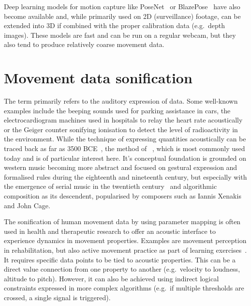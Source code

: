 Deep learning models for motion capture like PoseNet~\parencite{kendall2016posenet} or BlazePose~\parencite{bazarevsky2020blazepose} have also become available and, while primarily used on 2D (surveillance) footage, can be extended into 3D if combined with the proper calibration data (e.g.\ depth images).
These models are fast and can be run on a regular webcam, but they also tend to produce relatively coarse movement data.

\section{Movement data sonification}
\label{sec:movement-data-sonification}

The term  primarily refers to the auditory expression of data.
Some well-known examples include the beeping sounds used for parking assistance in cars, the electrocardiogram machines used in hospitals to relay the heart rate acoustically or the Geiger counter sonifying ionisation to detect the level of radioactivity in the environment.
While the technique of expressing quantities acoustically can be traced back as far as 3500 BCE~\parencite[178]{sonificationPreHistory}, the method of ~\parencite[Chapter~15]{sonificationHandbook}, which is most commonly used today and is of particular interest here.
It's conceptual foundation is grounded on western music becoming more abstract and focused on gestural expression and formalised rules during the eighteenth and nineteenth century, but especially with the emergence of serial music in the twentieth century~\parencite[179-180]{sonificationPreHistory} and algorithmic composition as its descendent, popularised by composers such as Iannis Xenakis and John Cage.

The sonification of human movement data by using parameter mapping is often used in health and therapeutic research to offer an acoustic interface to experience dynamics in movement properties.
Examples are movement perception in rehabilitation, but also active movement practice as part of learning exercises~\parencite[see][]{ifMotionSounds}.
It requires specific data points to be tied to acoustic properties.
This can be a direct value connection from one property to another (e.g.\ velocity to loudness, altitude to pitch).
However, it can also be achieved using indirect logical constraints expressed in more complex algorithms (e.g.\ if multiple thresholds are crossed, a single signal is triggered).

